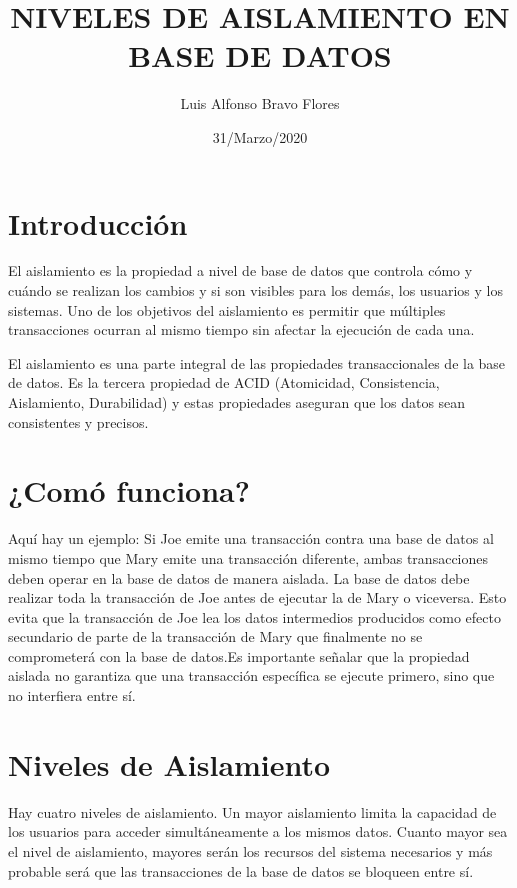 \documentclass{article}
\title{NIVELES DE AISLAMIENTO EN BASE DE DATOS}
\author{Luis Alfonso Bravo Flores} %
\date{31/Marzo/2020}
\begin{document}
\maketitle

\section{Introducción}

El aislamiento es la propiedad a nivel de base de datos que controla cómo y cuándo se realizan los cambios y si son visibles para los demás, los usuarios y los sistemas. Uno de los objetivos del aislamiento es permitir que múltiples transacciones ocurran al mismo tiempo sin afectar la ejecución de cada una.

El aislamiento es una parte integral de las propiedades transaccionales de la base de datos. Es la tercera propiedad de ACID (Atomicidad, Consistencia, Aislamiento, Durabilidad) y estas propiedades aseguran que los datos sean consistentes y precisos.

\section{¿Comó funciona?}

Aquí hay un ejemplo: Si Joe emite una transacción contra una base de datos al mismo tiempo que Mary emite una transacción diferente, ambas transacciones deben operar en la base de datos de manera aislada. La base de datos debe realizar toda la transacción de Joe antes de ejecutar la de Mary o viceversa. Esto evita que la transacción de Joe lea los datos intermedios producidos como efecto secundario de parte de la transacción de Mary que finalmente no se comprometerá con la base de datos.Es importante señalar que la propiedad aislada no garantiza que una transacción específica se ejecute primero, sino que no interfiera entre sí.
         

\section{Niveles de Aislamiento}

Hay cuatro niveles de aislamiento. Un mayor aislamiento limita la capacidad de los usuarios para acceder simultáneamente a los mismos datos. Cuanto mayor sea el nivel de aislamiento, mayores serán los recursos del sistema necesarios y más probable será que las transacciones de la base de datos se bloqueen entre sí.
\end{document}
